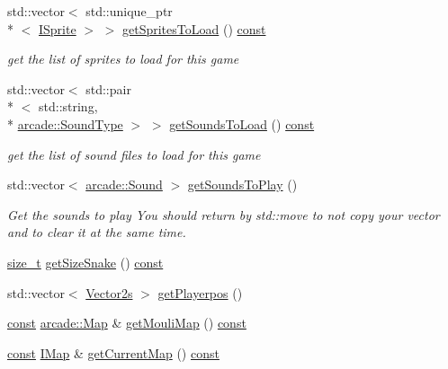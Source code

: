 \begin{DoxyCompactItemize}
std\-::vector$<$ std\-::unique\-\_\-ptr\\*
$<$ \hyperlink{classarcade_1_1_i_sprite}{I\-Sprite} $>$ $>$ \hyperlink{classarcade_1_1_snake_a374d85a7c4edc97ee0f8752d46b2050b}{get\-Sprites\-To\-Load} () \hyperlink{term__entry_8h_a57bd63ce7f9a353488880e3de6692d5a}{const} 
\begin{DoxyCompactList}\small\item\em get the list of sprites to load for this game \end{DoxyCompactList}\item 
std\-::vector$<$ std\-::pair\\*
$<$ std\-::string, \\*
\hyperlink{namespacearcade_a3bb4743a2eea59f3927e404e6549cae5}{arcade\-::\-Sound\-Type} $>$ $>$ \hyperlink{classarcade_1_1_snake_a01f86bd1b4717fc297aa20aea9ccaa3e}{get\-Sounds\-To\-Load} () \hyperlink{term__entry_8h_a57bd63ce7f9a353488880e3de6692d5a}{const} 
\begin{DoxyCompactList}\small\item\em get the list of sound files to load for this game \end{DoxyCompactList}\item 
std\-::vector$<$ \hyperlink{structarcade_1_1_sound}{arcade\-::\-Sound} $>$ \hyperlink{classarcade_1_1_snake_aa23dbd8172d217722f61c5a135a7613c}{get\-Sounds\-To\-Play} ()
\begin{DoxyCompactList}\small\item\em Get the sounds to play You should return by std\-::move to not copy your vector and to clear it at the same time. \end{DoxyCompactList}\item 
\hyperlink{nc__alloc_8h_a7b60c5629e55e8ec87a4547dd4abced4}{size\-\_\-t} \hyperlink{classarcade_1_1_snake_a43efbb7560b568215c9b40a6f3c32e4b}{get\-Size\-Snake} () \hyperlink{term__entry_8h_a57bd63ce7f9a353488880e3de6692d5a}{const} 
\item 
std\-::vector$<$ \hyperlink{namespacearcade_a8e527f7400fbff9c38dc31e0a3dd06a1}{Vector2s} $>$ \hyperlink{classarcade_1_1_snake_ac3dd17c52c0f8e23bcae2b248bce97b8}{get\-Playerpos} ()
\item 
\hyperlink{term__entry_8h_a57bd63ce7f9a353488880e3de6692d5a}{const} \hyperlink{classarcade_1_1_map}{arcade\-::\-Map} \& \hyperlink{classarcade_1_1_snake_a85999561250fdeabd7511db982c612e0}{get\-Mouli\-Map} () \hyperlink{term__entry_8h_a57bd63ce7f9a353488880e3de6692d5a}{const} 
\item 
\hyperlink{term__entry_8h_a57bd63ce7f9a353488880e3de6692d5a}{const} \hyperlink{classarcade_1_1_i_map}{I\-Map} \& \hyperlink{classarcade_1_1_snake_a545c6d0826e75962b41da44998620c4f}{get\-Current\-Map} () \hyperlink{term__entry_8h_a57bd63ce7f9a353488880e3de6692d5a}{const} 

\end{DoxyCompactItemize}
